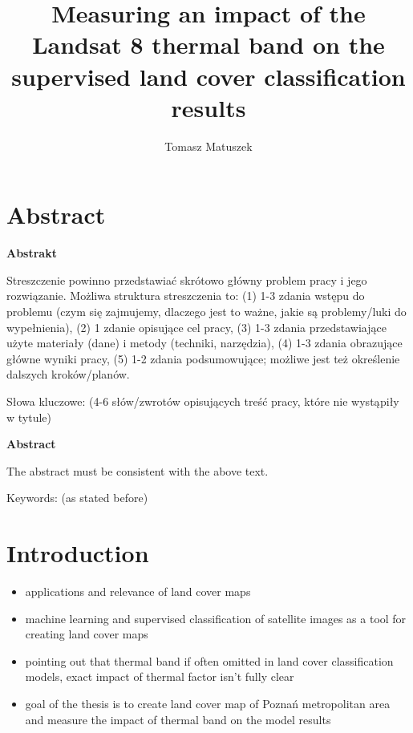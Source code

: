 \documentclass{amuthesis}
\author{Tomasz Matuszek}
\title{Measuring an impact of the Landsat 8 thermal band on the
supervised land cover classification results}
\begin{document}

\titlepage


\hypertarget{abstract}{%
\chapter*{Abstract}\label{abstract}}

\textbf{Abstrakt}

Streszczenie powinno przedstawiać skrótowo główny problem pracy i jego
rozwiązanie. Możliwa struktura streszczenia to: (1) 1-3 zdania wstępu do
problemu (czym się zajmujemy, dlaczego jest to ważne, jakie są
problemy/luki do wypełnienia), (2) 1 zdanie opisujące cel pracy, (3) 1-3
zdania przedstawiające użyte materiały (dane) i metody (techniki,
narzędzia), (4) 1-3 zdania obrazujące główne wyniki pracy, (5) 1-2
zdania podsumowujące; możliwe jest też określenie dalszych
kroków/planów.

Słowa kluczowe: (4-6 słów/zwrotów opisujących treść pracy, które nie
wystąpiły w tytule)

\textbf{Abstract}

The abstract must be consistent with the above text.

Keywords: (as stated before)

\newpage

\sf\tighttoc\doublespacing


\hypertarget{sec-intro}{%
\chapter{Introduction}\label{sec-intro}}

\begin{itemize}
\item
  applications and relevance of land cover maps
\item
  machine learning and supervised classification of satellite images as
  a tool for creating land cover maps
\item
  pointing out that thermal band if often omitted in land cover
  classification models, exact impact of thermal factor isn't fully
  clear
\item
  goal of the thesis is to create land cover map of Poznań metropolitan
  area and measure the impact of thermal band on the model results
\end{itemize}
\end{document}
